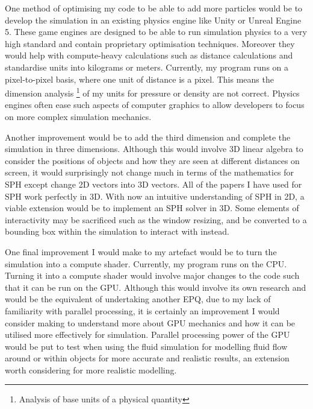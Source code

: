 \documentclass[write-up.tex]{subfiles}
\begin{document}
One method of optimising my code to be able to add more particles would be to develop the simulation in an existing physics engine like Unity or Unreal Engine 5. These game engines are designed to be able to run simulation physics to a very high standard and contain proprietary optimisation techniques. Moreover they would help with compute-heavy calculations such as distance calculations and standardise units into kilograms or meters. Currently, my program runs on a pixel-to-pixel basis, where one unit of distance is a pixel. This means the dimension analysis \footnote{Analysis of base units of a physical quantity} of my units for pressure or density are not correct. Physics engines often ease such aspects of computer graphics to allow developers to focus on more complex simulation mechanics.

Another improvement would be to add the third dimension and complete the simulation in three dimensions. Although this would involve 3D linear algebra to consider the positions of objects and how they are seen at different distances on screen, it would surprisingly not change much in terms of the mathematics for SPH except change 2D vectors into 3D vectors. All of the papers I have used for SPH work perfectly in 3D. With now an intuitive understanding of SPH in 2D, a viable extension would be to implement an SPH solver in 3D. Some elements of interactivity may be sacrificed such as the window resizing, and be converted to a bounding box within the simulation to interact with instead.

One final improvement I would make to my artefact would be to turn the simulation into a compute shader. Currently, my program runs on the CPU. Turning it into a compute shader would involve major changes to the code such that it can be run on the GPU. Although this would involve its own research and would be the equivalent of undertaking another EPQ, due to my lack of familiarity with parallel processing, it is certainly an improvement I would consider making to understand more about GPU mechanics and how it can be utilised more effectively for simulation. Parallel processing power of the GPU would be put to test when using the fluid simulation for modelling fluid flow around or within objects for more accurate and realistic results, an extension worth considering for more realistic modelling.

\end{document}
